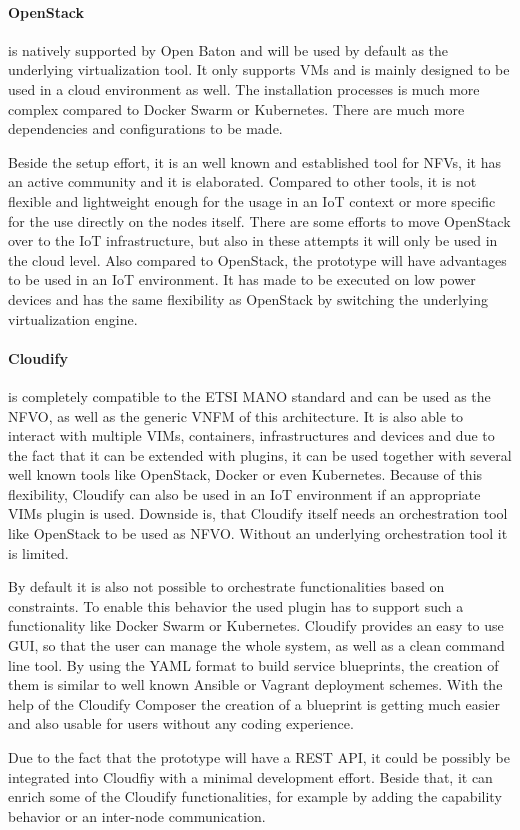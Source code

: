 \paragraph{OpenStack} is natively supported by Open Baton and will be used by default as the underlying virtualization tool.
It only supports \acp{VM} and is mainly designed to be used in a cloud environment as well.
The installation processes is much more complex compared to Docker Swarm or Kubernetes.
There are much more dependencies and configurations to be made.

Beside the setup effort, it is an well known and established tool for \acp{NFV}, it has an active community and it is elaborated.
Compared to other tools, it is not flexible and lightweight enough for the usage in an \ac{IoT} context or more specific for the use directly on the nodes itself.
There are some efforts to move OpenStack over to the \ac{IoT} infrastructure\autocite{OpenStack:IoT}\autocite{OpenStack:Kubernetes:IoT}, but also in these attempts it will only be used in the cloud level.
Also compared to OpenStack, the prototype will have advantages to be used in an \ac{IoT} environment.
It has made to be executed on low power devices and has the same flexibility as OpenStack by switching the underlying virtualization engine.

\paragraph{Cloudify} is completely compatible to the \ac{ETSI} \ac{MANO} standard and can be used as the \ac{NFVO}, as well as the generic \ac{VNFM} of this architecture.\autocite[cf.]{Cloudify:MANO}
It is also able to interact with multiple \acp{VIM}, containers, infrastructures and devices and due to the fact that it can be extended with plugins, it can be used together with several well known tools like OpenStack, Docker or even Kubernetes.\autocite[cf.]{Cloudify:MANO}
Because of this flexibility, Cloudify can also be used in an \ac{IoT} environment if an appropriate \acp{VIM} plugin is used.
Downside is, that Cloudify itself needs an orchestration tool like OpenStack to be used as \ac{NFVO}.
Without an underlying orchestration tool it is limited.

By default it is also not possible to orchestrate functionalities based on constraints.
To enable this behavior the used plugin has to support such a functionality like Docker Swarm or Kubernetes.
Cloudify provides an easy to use \ac{GUI}, so that the user can manage the whole system, as well as a clean command line tool.
By using the \ac{YAML} format to build service blueprints, the creation of them is similar to well known Ansible or Vagrant deployment schemes.
With the help of the Cloudify Composer the creation of a blueprint is getting much easier and also usable for users without any coding experience.

Due to the fact that the prototype will have a \ac{REST} \ac{API}, it could be possibly be integrated into Cloudfiy with a minimal development effort.
Beside that, it can enrich some of the Cloudify functionalities, for example by adding the capability behavior or an inter-node communication.

